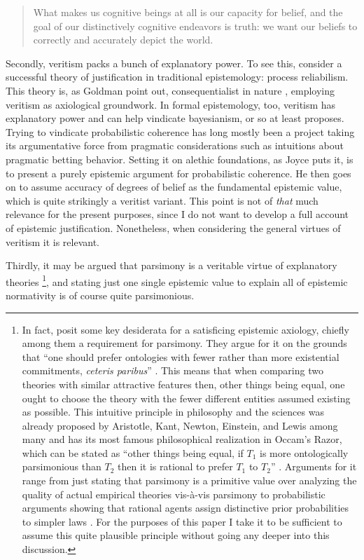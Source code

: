 \documentclass[12pt,numbers=noenddot]{scrartcl}
\begin{document}
\begin{quote}
What makes us cognitive beings at all is our capacity for belief, and the goal of our distinctively cognitive endeavors is truth: we want our beliefs to correctly and accurately depict the world. \autocite[7]{Bonjour1985}
\end{quote}

Secondly, veritism packs a bunch of explanatory power. To see this, consider a successful theory of justification in traditional epistemology: process reliabilism. This theory is, as Goldman point out, consequentialist in nature \autocite{Goldman2002-GOLTUO-2}, employing veritism as axiological groundwork. In formal epistemology, too, veritism has explanatory power and can help vindicate bayesianism, or so at least \textcite{Joyce2009-JOYAAC} proposes. Trying to vindicate probabilistic coherence has long mostly been a project taking its argumentative force from pragmatic considerations such as intuitions about pragmatic betting behavior. Setting it on alethic foundations, as Joyce puts it, is to present a purely epistemic argument for probabilistic coherence. He then goes on to assume accuracy of degrees of belief as the fundamental epistemic value, which is quite strikingly a veritist variant. This point is not of \emph{that} much relevance for the present purposes, since I do not want to develop a full account of epistemic justification. Nonetheless, when considering the general virtues of veritism it is relevant.

Thirdly, it may be argued that parsimony is a veritable virtue of explanatory theories \footnote{In fact, \textcite[342]{Ahlstrom-Vij2013} posit some key desiderata for a satisficing epistemic axiology, chiefly among them a requirement for parsimony. They argue for it on the grounds that “one should prefer ontologies with fewer rather than more existential commitments, \emph{ceteris paribus}” \autocite{Ahlstrom-Vij2013}. This means that when comparing two theories with similar attractive features then, other things being equal, one ought to choose the theory with the fewer different entities assumed existing as possible. This intuitive principle in philosophy and the sciences was already proposed by Aristotle, Kant, Newton, Einstein, and Lewis among many \autocite[3]{sep-simplicity} and has its most famous philosophical realization in Occam's Razor, which can be stated as “other things being equal, if $T_1$ is more ontologically parsimonious than $T_2$ then it is rational to prefer $T_1$ to $T_2$” \autocite[7]{sep-simplicity}. Arguments for it range from just stating that parsimony is a primitive value over analyzing the quality of actual empirical theories vis-à-vis parsimony to probabilistic arguments showing that rational agents assign distinctive prior probabilities to simpler laws \autocite[11-26]{sep-simplicity}. For the purposes of this paper I take it to be sufficient to assume this quite plausible principle without going any deeper into this discussion.},
and stating just one single epistemic value to explain all of epistemic normativity is of course quite parsimonious.
\end{document}

